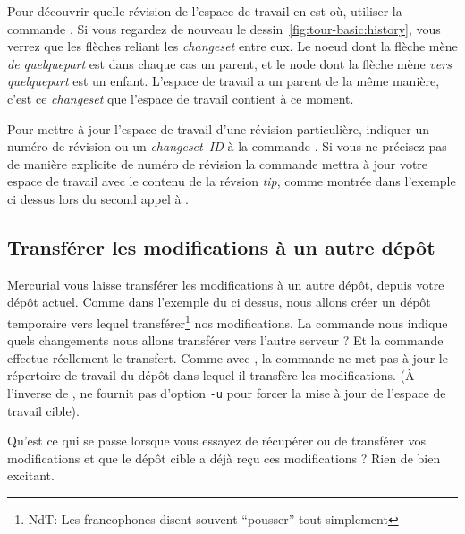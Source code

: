 Pour découvrir quelle révision de l'espace de travail en est où, utiliser
la commande . 
Si vous regardez de nouveau le dessin~\ref{fig:tour-basic:history}, vous
verrez que les flèches reliant les \textit{changeset} entre eux. Le noeud 
dont la flèche mène \emph{de quelquepart} est dans chaque cas un parent, 
et le node dont la flèche mène \emph{vers quelquepart} est un enfant. %
L'espace de travail a un parent de la même manière, c'est ce \textit{changeset} 
que l'espace de travail contient à ce moment.

Pour mettre à jour l'espace de travail d'une révision particulière, 
indiquer un numéro de révision ou un \textit{changeset~ID} à la commande 
.
Si vous ne précisez pas de manière explicite de numéro de révision
la commande  mettra à jour votre espace de travail avec
le contenu de la révsion \textit{tip}, comme montrée dans l'exemple 
ci dessus lors du second appel à .

\subsection{Transférer les modifications à un autre dépôt}

Mercurial vous laisse transférer les modifications à un autre
dépôt, depuis votre dépôt actuel. Comme dans l'exemple du 
 ci dessus, nous allons créer un dépôt temporaire
vers lequel transférer\footnote{NdT: Les francophones disent souvent 
``pousser'' tout simplement} nos modifications.
La commande  nous indique quels changements nous
allons transférer vers l'autre serveur ?
Et la commande  effectue réellement le transfert.
Comme avec , la commande  ne met pas à jour
le répertoire de travail du dépôt dans lequel il transfère les 
modifications. (À l'inverse de ,  ne fournit
pas d'option \texttt{-u} pour forcer la mise à jour de l'espace
de travail cible).

Qu'est ce qui se passe lorsque vous essayez de récupérer ou de transférer
vos modifications et que le dépôt cible a déjà reçu ces modifications ? 
Rien de bien excitant.

